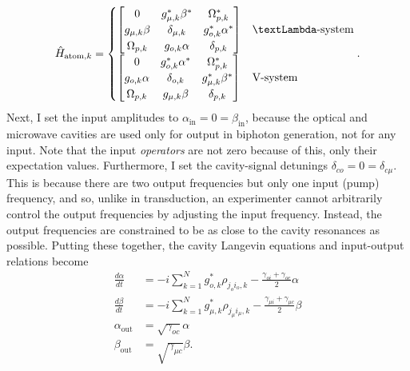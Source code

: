 \begin{equation}
    \label{eq:biphoton_atom_hamiltonian}
    \hat{H}_{\text{atom},k} =
    \begin{cases}
        \begin{bmatrix}
            0 & g_{\mu,k}^*\beta^* & \Omega_{p,k}^*\\
            g_{\mu,k}\beta & \delta_{\mu,k} & g_{o,k}^*\alpha^*\\
            \Omega_{p,k} & g_{o,k}\alpha & \delta_{p,k}
        \end{bmatrix} & \text{\textLambda-system}\\
        \begin{bmatrix}
            0 & g_{o,k}^*\alpha^* & \Omega_{p,k}^*\\
            g_{o,k}\alpha & \delta_{o,k} & g_{\mu,k}^*\beta^*\\
            \Omega_{p,k} & g_{\mu,k}\beta & \delta_{p,k}
        \end{bmatrix} & \text{V-system}
    \end{cases}.
\end{equation}
Next, I set the input amplitudes to $\alpha_\text{in} = 0 = \beta_\text{in}$, because the optical and microwave cavities are used only for output in biphoton generation, not for any input. Note that the input \textit{operators} are not zero because of this, only their expectation values. Furthermore, I set the cavity-signal detunings $\delta_{co} = 0 = \delta_{c\mu}$. This is because there are two output frequencies but only one input (pump) frequency, and so, unlike in transduction, an experimenter cannot arbitrarily control the output frequencies by adjusting the input frequency. Instead, the output frequencies are constrained to be as close to the cavity resonances as possible. Putting these together, the cavity Langevin equations and input-output relations become
\begin{align}
    \frac{d\alpha}{dt} &= -i\sum_{k=1}^{N} g_{o,k}^*\rho_{j_oi_o,k} - \frac{\gamma_{oi}+\gamma_{oc}}{2}\alpha \label{eq:biphoton_optical_cavity_langevin_equation}\\
    \frac{d\beta}{dt} &= -i\sum_{k=1}^{N} g_{\mu,k}^*\rho_{j_\mu i_\mu,k} - \frac{\gamma_{\mu i}+\gamma_{\mu c}}{2}\beta \label{eq:biphoton_microwave_cavity_langevin_equation}\\
    \alpha_\text{out} &= \sqrt{\gamma_{oc}}\alpha\\
    \beta_\text{out} &= \sqrt{\gamma_{\mu c}}\beta.
\end{align}

